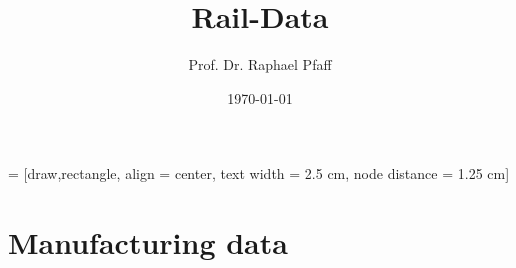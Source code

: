 \documentclass[10pt,slidestop,compress,mathserif, aspectratio = 169]{beamer}
\begin{document}
 = [draw,rectangle, align = center, text width = 2.5 cm, node distance = 1.25 cm]

\newcommand{\Var}{\operatorname{Var}}
\newcommand{\mum}{\operatorname{\mu m}}
\newcommand{\E}{\operatorname{E}}
\newcommand{\offslide}[2]{\frame{\frametitle{ \includegraphics[scale=0.01] {Off}\hspace{1.5mm} #1}
\framesubtitle{#2}
}}
\newcommand{\source}[1]{\rotatebox{90}{\tiny \color{gray} #1}}

\title{Rail-Data}
\author[R. Pfaff]{Prof. Dr. Raphael Pfaff}
\date{\today}
\begin{frame} %
\titlepage
\end{frame}

%




%

%
%







\section{Manufacturing data}

% 
% 
% 


\end{document}
